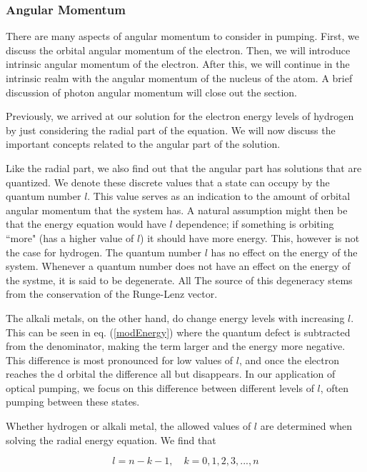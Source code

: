 \documentclass[letter,12pt]{article}
\begin{document}
		\subsubsection{Angular Momentum}\label{angularMomentum}
		There are many aspects of angular momentum to consider
		in pumping. First, we discuss the orbital angular momentum of 
		the electron. Then, we will introduce intrinsic angular momentum
		of the electron. After this, we will continue in the intrinsic 
		realm with the angular momentum of the nucleus of the atom.
		A brief discussion of photon angular momentum will
		close out the section.

        Previously, we arrived at our solution for the electron energy 
		levels
        of hydrogen by just considering the radial part of the
        equation. We will now discuss the important concepts related
        to the angular part of the solution. 
        
        Like the radial part, 
        we also find out that the angular part has solutions that 
        are quantized. We denote these discrete values that a state
		can occupy by the quantum number $l$. This value serves as an
		indication to the amount of orbital angular momentum that the 
		system has. A natural assumption might then be that
		the energy equation would have $l$ dependence; if 
		something is orbiting ``more" (has a higher value 
		of $l$) it should have more energy. This, however is not
		the case for hydrogen. The quantum number $l$ has no effect on the 
		energy of the system. Whenever a quantum number does not
		have an effect on the energy of the systme, it is said to
		be degenerate. All The source of this degeneracy stems from 
		the conservation of the Runge-Lenz vector.

		The alkali metals, on the other hand, do change energy levels with
		increasing $l$. This can be seen in eq. (\ref{modEnergy}) where 
		the quantum defect
		is subtracted from the denominator, making the term larger and the
		energy more negative.
		This difference is most pronounced for low values 
		of $l$, and once the electron reaches the d orbital the difference
		all but disappears. In our application of optical pumping,
		we focus on this difference between different levels of $l$,
		often pumping between these states.
		
		Whether hydrogen or alkali metal, the allowed 
		values of $l$ are determined when solving
		the radial energy equation. We find that

		\begin{equation}
			l=n-k-1,\quad k=0,1,2,3,...,n
		\end{equation}
\end{document}
